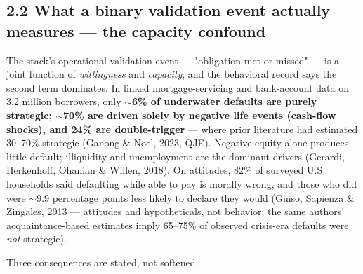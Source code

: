 \documentclass[11pt,twocolumn]{article}
\begin{document}
\subsection*{2.2 What a binary validation event actually measures --- the capacity confound}

The stack's operational validation event --- "obligation met or missed" --- is a joint function of \emph{willingness} and \emph{capacity}, and the behavioral record says the second term dominates. In linked mortgage-servicing and bank-account data on 3.2 million borrowers, only \textbf{$\sim$6\% of underwater defaults are purely strategic; $\sim$70\% are driven solely by negative life events (cash-flow shocks), and 24\% are double-trigger} --- where prior literature had estimated 30--70\% strategic (Ganong \& Noel, 2023, QJE). Negative equity alone produces little default; illiquidity and unemployment are the dominant drivers (Gerardi, Herkenhoff, Ohanian \& Willen, 2018). On attitudes, 82\% of surveyed U.S. households said defaulting while able to pay is morally wrong, and those who did were $\sim$9.9 percentage points less likely to declare they would (Guiso, Sapienza \& Zingales, 2013 --- attitudes and hypotheticals, not behavior; the same authors' acquaintance-based estimates imply 65--75\% of observed crisis-era defaults were \emph{not} strategic).

Three consequences are stated, not softened:
\end{document}

